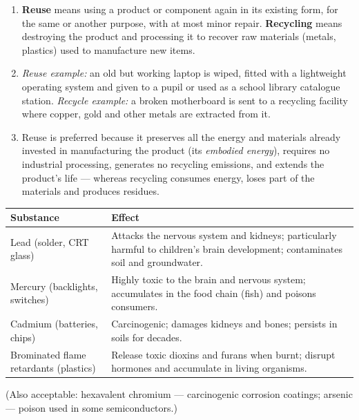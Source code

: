 \documentclass[11pt]{article}
\begin{document}
\begin{corrige}
\begin{enumerate}
\item \textbf{Reuse} means using a product or component again in its existing form, for the same or another purpose, with at most minor repair. \textbf{Recycling} means destroying the product and processing it to recover raw materials (metals, plastics) used to manufacture new items.
\item \emph{Reuse example:} an old but working laptop is wiped, fitted with a lightweight operating system and given to a pupil or used as a school library catalogue station. \emph{Recycle example:} a broken motherboard is sent to a recycling facility where copper, gold and other metals are extracted from it.
\item Reuse is preferred because it preserves all the energy and materials already invested in manufacturing the product (its \emph{embodied energy}), requires no industrial processing, generates no recycling emissions, and extends the product's life --- whereas recycling consumes energy, loses part of the materials and produces residues.
\end{enumerate}
\end{corrige}

\begin{corrige}
\begin{center}
\begin{tabularx}{\linewidth}{|l|X|}
\hline
\rowcolor{popblueL} \textbf{Substance} & \textbf{Effect} \\
\hline
Lead (solder, CRT glass) & Attacks the nervous system and kidneys; particularly harmful to children's brain development; contaminates soil and groundwater. \\
\hline
Mercury (backlights, switches) & Highly toxic to the brain and nervous system; accumulates in the food chain (fish) and poisons consumers. \\
\hline
Cadmium (batteries, chips) & Carcinogenic; damages kidneys and bones; persists in soils for decades. \\
\hline
Brominated flame retardants (plastics) & Release toxic dioxins and furans when burnt; disrupt hormones and accumulate in living organisms. \\
\hline
\end{tabularx}
\end{center}
(Also acceptable: hexavalent chromium --- carcinogenic corrosion coatings; arsenic --- poison used in some semiconductors.)
\end{corrige}
\end{document}
